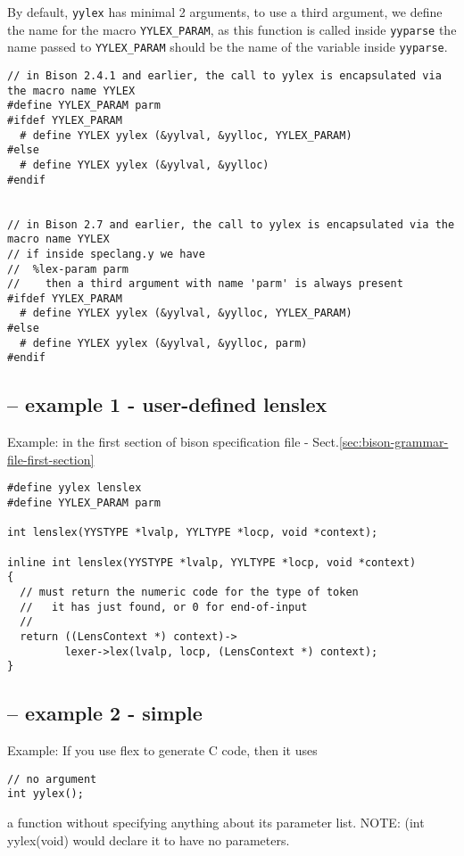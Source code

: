 By default, \verb!yylex! has minimal 2 arguments, to use a third argument, we define the name for the macro 
\verb!YYLEX_PARAM!, as this function is called inside \verb!yyparse! the name passed to \verb!YYLEX_PARAM! should be the name of the 
variable inside \verb!yyparse!.

\begin{verbatim}
// in Bison 2.4.1 and earlier, the call to yylex is encapsulated via the macro name YYLEX
#define YYLEX_PARAM parm
#ifdef YYLEX_PARAM
  # define YYLEX yylex (&yylval, &yylloc, YYLEX_PARAM)
#else
  # define YYLEX yylex (&yylval, &yylloc)
#endif


// in Bison 2.7 and earlier, the call to yylex is encapsulated via the macro name YYLEX
// if inside speclang.y we have
//  %lex-param parm
//    then a third argument with name 'parm' is always present
#ifdef YYLEX_PARAM
  # define YYLEX yylex (&yylval, &yylloc, YYLEX_PARAM)
#else
  # define YYLEX yylex (&yylval, &yylloc, parm)
#endif

\end{verbatim}

\subsection{-- example 1 - user-defined lenslex}


Example: in the first section of bison specification file - Sect.\ref{sec:bison-grammar-file-first-section}
\begin{verbatim}
#define yylex lenslex
#define YYLEX_PARAM parm

int lenslex(YYSTYPE *lvalp, YYLTYPE *locp, void *context);

inline int lenslex(YYSTYPE *lvalp, YYLTYPE *locp, void *context)
{
  // must return the numeric code for the type of token 
  //   it has just found, or 0 for end-of-input
  //
  return ((LensContext *) context)->
         lexer->lex(lvalp, locp, (LensContext *) context);
}

\end{verbatim}


\subsection{-- example 2 - simple}

Example:
If you use flex to generate C code, then it uses
\begin{verbatim}
// no argument
int yylex();
\end{verbatim}
 a function without specifying anything about its parameter list.
NOTE: (int yylex(void) would declare it to have no parameters.

